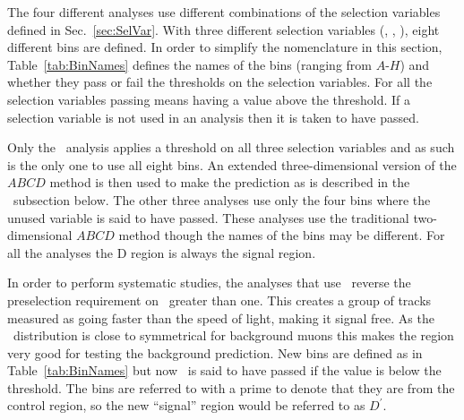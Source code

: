 The four different analyses use different combinations of the selection variables defined in Sec.~\ref{sec:SelVar}. 
With three different selection variables (\pt, \invbeta, \dedx), eight different bins are defined.
In order to simplify the nomenclature in this section, Table~\ref{tab:BinNames} 
defines the names of the bins (ranging from $A$-$H$) and whether they pass or fail the thresholds on the selection variables. For all
the selection variables passing means having a value above the threshold. If a selection variable
is not used in an analysis then it is taken to have passed. 

Only the \tktof\ analysis applies a threshold on all three selection variables and as such is the only one to use all eight bins.
An extended three-dimensional version of the $ABCD$ method is then used to make the prediction as is described in the \tktof\ subsection below.
The other three analyses use only the four bins where the unused variable is said to have passed. These analyses use the traditional two-dimensional $ABCD$ method
though the names of the bins may be different.
For all the analyses the D region is always the signal region. 

In order to perform systematic studies, the analyses that use \invbeta\ reverse the preselection requirement on \invbeta\ greater than one. This creates a group of tracks
measured as going faster than the speed of light, making it signal free. As the \invbeta\ distribution is close to symmetrical for background muons this makes
the region very good for testing the background prediction. New bins are defined as in Table~\ref{tab:BinNames} but now \invbeta\ is said to have passed
if the value is below the threshold. The bins are referred to with a prime to denote that they are from the control region, so the new ``signal'' region would
be referred to as $D^{\prime}$.


